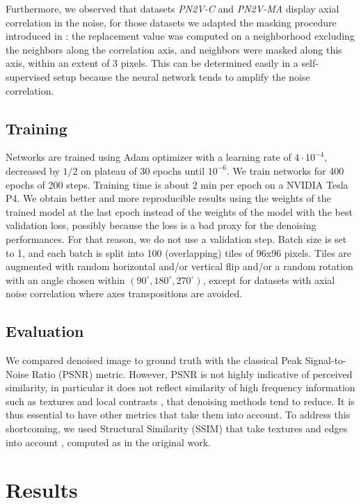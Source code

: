 \documentclass[lettersize,journal]{IEEEtran}
\begin{document}
Furthermore, we observed that datasets \emph{PN2V-C} and \emph{PN2V-MA} display axial correlation in the noise, for those datasets we adapted the masking procedure introduced in \cite{broaddus2020removing}: the replacement value was computed on a neighborhood excluding the neighbors along the correlation axis, and neighbors were masked along this axis, within an extent of 3 pixels. This can be determined easily in a self-supervised setup because the neural network tends to amplify the noise correlation.

\subsection{Training}
\label{sec:training}
Networks are trained using Adam optimizer with a learning rate of $4\cdot10^{-4}$, decreased by $1/2$ on plateau of 30 epochs until $10^{-6}$. We train networks for 400 epochs of 200 steps.
Training time is about 2 min per epoch on a NVIDIA Tesla P4.
We obtain better and more reproducible results using the weights of the trained model at the last epoch instead of the weights of the model with the best validation loss, possibly because the loss is a bad proxy for the denoising performances. For that reason, we do not use a validation step.
Batch size is set to 1, and each batch is split into 100 (overlapping) tiles of 96x96 pixels.
Tiles are augmented with random horizontal and/or vertical flip and/or a random rotation with an angle chosen within $(90^\circ, 180^\circ, 270^\circ)$, except for datasets with axial noise correlation where axes transpositions are avoided.

\subsection{Evaluation}
We compared denoised image to ground truth with the classical Peak Signal-to-Noise Ratio (PSNR) metric.
However, PSNR is not highly indicative of perceived similarity, in particular it does not reflect similarity of high frequency information such as textures and local contrasts \cite{wang2004image}, that denoising methods tend to reduce. It is thus essential to have other metrics that take them into account.
To address this shortcoming, we used Structural Similarity (SSIM) that take textures and edges into account \cite{wang2004image}, computed as in the original work.

\section{Results}
\label{sec:results}
\end{document}
